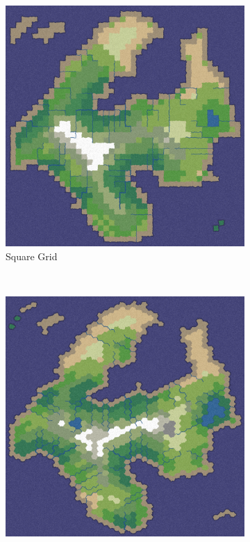 \begin{figure}
        \centering
        \begin{subfigure}[b]{0.45\textwidth}
                \includegraphics[width=\textwidth]{Square.png}
                \caption{Square Grid}
                \label{fig:Square}
        \end{subfigure}%
        ~ %
        \begin{subfigure}[b]{0.45\textwidth}
                \includegraphics[width=\textwidth]{Hex.png}

\end{subfigure}
\end{figure}
